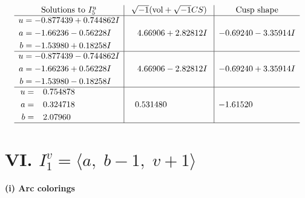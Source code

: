 \documentclass[1p]{elsarticle_modified}
\theoremstyle{definition}
\newcommand{\I}{\sqrt{-1}}
\begin{document}
$$\begin{array}{c|c|c}  
\text{Solutions to }I^u_{5}& \I (\text{vol} + \sqrt{-1}CS) & \text{Cusp shape}\\
 \hline 
\begin{aligned}
u &= -0.877439 + 0.744862 I \\
a &= -1.66236 - 0.56228 I \\
b &= -1.53980 + 0.18258 I\end{aligned}
 & \phantom{-}4.66906 + 2.82812 I & -0.69240 - 3.35914 I \\ \hline\begin{aligned}
u &= -0.877439 - 0.744862 I \\
a &= -1.66236 + 0.56228 I \\
b &= -1.53980 - 0.18258 I\end{aligned}
 & \phantom{-}4.66906 - 2.82812 I & -0.69240 + 3.35914 I \\ \hline\begin{aligned}
u &= \phantom{-}0.754878\phantom{ +0.000000I} \\
a &= \phantom{-}0.324718\phantom{ +0.000000I} \\
b &= \phantom{-}2.07960\phantom{ +0.000000I}\end{aligned}
 & \phantom{-}0.531480\phantom{ +0.000000I} & -1.61520\phantom{ +0.000000I}\\
 \hline 
 \end{array}$$\newpage\newpage\renewcommand{\arraystretch}{1}
\centering \section*{VI. $I^v_{1}= \langle a,\;b-1,\;v+1 \rangle$}
\flushleft \textbf{(i) Arc colorings}\\
\end{document}
